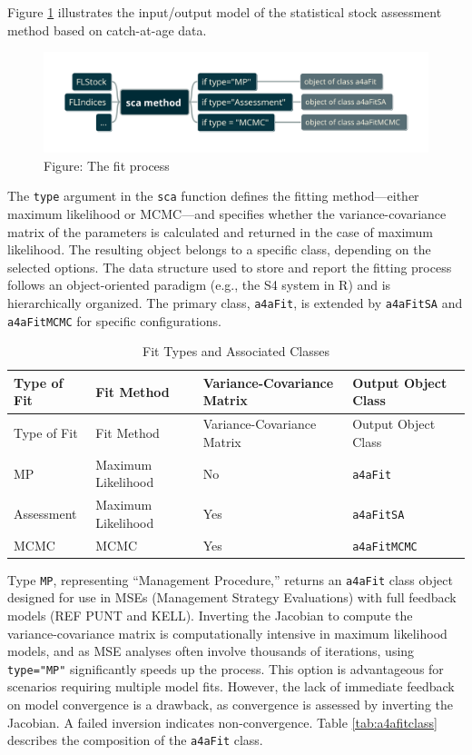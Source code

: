 \documentclass[
]{book}
\begin{document}
Figure \ref{fig:sca} illustrates the input/output model of the statistical stock assessment method based on catch-at-age data.

\begin{figure}
\centering
\includegraphics{scamethod.png}
\caption{Figure: \label{fig:sca} The fit process}
\end{figure}

The \texttt{type} argument in the \texttt{sca} function defines the fitting method---either maximum likelihood or MCMC---and specifies whether the variance-covariance matrix of the parameters is calculated and returned in the case of maximum likelihood. The resulting object belongs to a specific class, depending on the selected options. The data structure used to store and report the fitting process follows an object-oriented paradigm (e.g., the S4 system in R) and is hierarchically organized. The primary class, \texttt{a4aFit}, is extended by \texttt{a4aFitSA} and \texttt{a4aFitMCMC} for specific configurations.

\begin{longtable}[]{@{}llll@{}}
\caption{\label{tab:scatype} Fit Types and Associated Classes}\tabularnewline
\toprule\noalign{}
Type of Fit & Fit Method & Variance-Covariance Matrix & Output Object Class \\
\midrule\noalign{}
\endfirsthead
\toprule\noalign{}
Type of Fit & Fit Method & Variance-Covariance Matrix & Output Object Class \\
\midrule\noalign{}
\endhead
\bottomrule\noalign{}
\endlastfoot
MP & Maximum Likelihood & No & \texttt{a4aFit} \\
Assessment & Maximum Likelihood & Yes & \texttt{a4aFitSA} \\
MCMC & MCMC & Yes & \texttt{a4aFitMCMC} \\
\end{longtable}

Type \texttt{MP}, representing ``Management Procedure,'' returns an \texttt{a4aFit} class object designed for use in MSEs (Management Strategy Evaluations) with full feedback models (REF PUNT and KELL). Inverting the Jacobian to compute the variance-covariance matrix is computationally intensive in maximum likelihood models, and as MSE analyses often involve thousands of iterations, using \texttt{type="MP"} significantly speeds up the process. This option is advantageous for scenarios requiring multiple model fits. However, the lack of immediate feedback on model convergence is a drawback, as convergence is assessed by inverting the Jacobian. A failed inversion indicates non-convergence. Table \ref{tab:a4afitclass} describes the composition of the \texttt{a4aFit} class.
\end{document}
